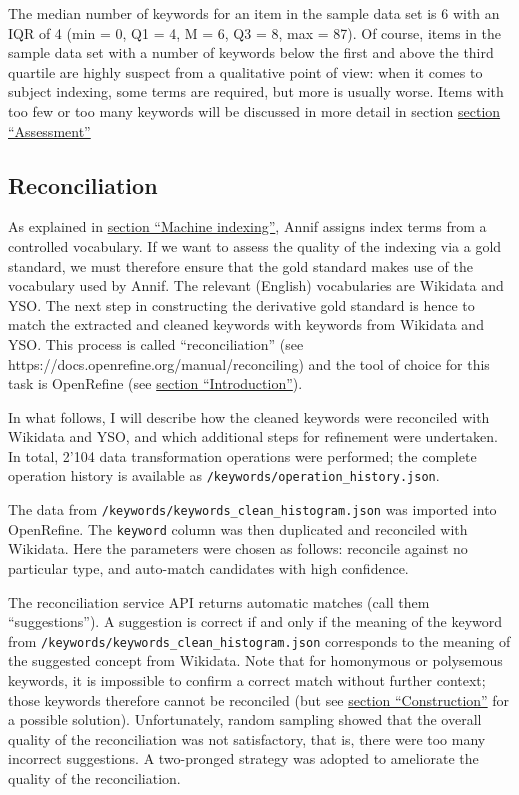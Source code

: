 The median number of keywords for an item in the sample data set is 6
with an IQR of 4 (min = 0, Q1 = 4, M = 6, Q3 = 8, max = 87). Of course,
items in the sample data set with a number of keywords below the first
and above the third quartile are highly suspect from a qualitative point
of view: when it comes to subject indexing, some terms are required, but
more is usually worse. Items with too few or too many keywords will be
discussed in more detail in section
\protect\hyperlink{assessment}{section ``Assessment''}

\hypertarget{reconciliation}{%
\subsection{Reconciliation}\label{reconciliation}}

As explained in \protect\hyperlink{machine-indexing}{section ``Machine
indexing''}, Annif assigns index terms from a controlled vocabulary. If
we want to assess the quality of the indexing via a gold standard, we
must therefore ensure that the gold standard makes use of the vocabulary
used by Annif. The relevant (English) vocabularies are Wikidata and YSO.
The next step in constructing the derivative gold standard is hence to
match the extracted and cleaned keywords with keywords from Wikidata and
YSO. This process is called ``reconciliation'' (see
https://docs.openrefine.org/manual/reconciling) and the tool of choice
for this task is OpenRefine (see
\protect\hyperlink{introduction}{section ``Introduction''}).

In what follows, I will describe how the cleaned keywords were
reconciled with Wikidata and YSO, and which additional steps for
refinement were undertaken. In total, 2'104 data transformation
operations were performed; the complete operation history is available
as \texttt{/keywords/operation\_history.json}.

The data from \texttt{/keywords/keywords\_clean\_histogram.json} was
imported into OpenRefine. The \texttt{keyword} column was then
duplicated and reconciled with Wikidata. Here the parameters were chosen
as follows: reconcile against no particular type, and auto-match
candidates with high confidence.

The reconciliation service API returns automatic matches (call them
``suggestions''). A suggestion is correct if and only if the meaning of
the keyword from \texttt{/keywords/keywords\_clean\_histogram.json}
corresponds to the meaning of the suggested concept from Wikidata. Note
that for homonymous or polysemous keywords, it is impossible to confirm
a correct match without further context; those keywords therefore cannot
be reconciled (but see \protect\hyperlink{construction}{section
``Construction''} for a possible solution). Unfortunately, random
sampling showed that the overall quality of the reconciliation was not
satisfactory, that is, there were too many incorrect suggestions. A
two-pronged strategy was adopted to ameliorate the quality of the
reconciliation.


